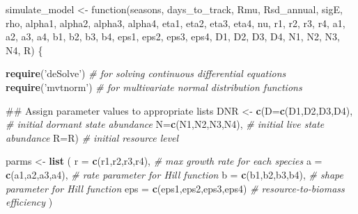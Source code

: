 \documentclass[11pt,]{article}
\newenvironment{Shaded}{\begin{snugshade}}{\end{snugshade}}
\newcommand{\KeywordTok}[1]{\textcolor[rgb]{0.13,0.29,0.53}{\textbf{{#1}}}}
\newcommand{\DataTypeTok}[1]{\textcolor[rgb]{0.13,0.29,0.53}{{#1}}}
\newcommand{\StringTok}[1]{\textcolor[rgb]{0.31,0.60,0.02}{{#1}}}
\newcommand{\CommentTok}[1]{\textcolor[rgb]{0.56,0.35,0.01}{\textit{{#1}}}}
\newcommand{\NormalTok}[1]{{#1}}
\begin{document}
\begin{Shaded}
\begin{Highlighting}[]
\NormalTok{simulate_model <-}\StringTok{ }\NormalTok{function(seasons, days_to_track, Rmu, }
                           \NormalTok{Rsd_annual, sigE, rho, }
                           \NormalTok{alpha1, alpha2, alpha3, alpha4,}
                           \NormalTok{eta1, eta2, eta3, eta4,}
                           \NormalTok{nu, r1, r2, r3, r4,}
                           \NormalTok{a1, a2, a3, a4,}
                           \NormalTok{b1, b2, b3, b4,}
                           \NormalTok{eps1, eps2, eps3, eps4,}
                           \NormalTok{D1, D2, D3, D4,}
                           \NormalTok{N1, N2, N3, N4, R) \{}
  
  \KeywordTok{require}\NormalTok{(}\StringTok{'deSolve'}\NormalTok{) }\CommentTok{# for solving continuous differential equations}
  \KeywordTok{require}\NormalTok{(}\StringTok{'mvtnorm'}\NormalTok{) }\CommentTok{# for multivariate normal distribution functions}
  
  \NormalTok{##  Assign parameter values to appropriate lists}
  \NormalTok{DNR <-}\StringTok{ }\KeywordTok{c}\NormalTok{(}\DataTypeTok{D=}\KeywordTok{c}\NormalTok{(D1,D2,D3,D4),   }\CommentTok{# initial dormant state abundance}
           \DataTypeTok{N=}\KeywordTok{c}\NormalTok{(N1,N2,N3,N4),   }\CommentTok{# initial live state abundance}
           \DataTypeTok{R=}\NormalTok{R)                }\CommentTok{# initial resource level}
  
  \NormalTok{parms <-}\StringTok{ }\KeywordTok{list} \NormalTok{(}
    \DataTypeTok{r   =} \KeywordTok{c}\NormalTok{(r1,r2,r3,r4),          }\CommentTok{# max growth rate for each species}
    \DataTypeTok{a   =} \KeywordTok{c}\NormalTok{(a1,a2,a3,a4),          }\CommentTok{# rate parameter for Hill function }
    \DataTypeTok{b   =} \KeywordTok{c}\NormalTok{(b1,b2,b3,b4),          }\CommentTok{# shape parameter for Hill function}
    \DataTypeTok{eps =} \KeywordTok{c}\NormalTok{(eps1,eps2,eps3,eps4)   }\CommentTok{# resource-to-biomass efficiency}
  \NormalTok{)}
  

\end{Highlighting}
\end{Shaded}
\end{document}
